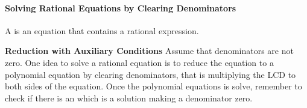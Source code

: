 
\paragraph*{Solving Rational Equations by Clearing Denominators}
	A  is an equation that contains a rational expression.

\begin{trick}
	\textbf{Reduction with Auxiliary Conditions} Assume that denominators are not zero. One idea to solve a rational equation is to reduce the equation to a polynomial equation by clearing denominators, that is multiplying the LCD to both sides of the equation. Once the polynomial equations is solve, remember to check if there is an  which is a solution making a denominator zero.
\end{trick}	

	


